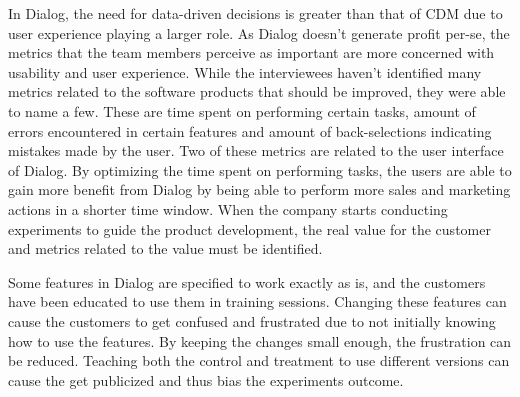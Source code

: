 \documentclass[english]{tktltiki2}
\theoremstyle{definition}
\theoremstyle{remark}
\begin{document}
In Dialog, the need for data-driven decisions is greater than that of CDM due to user experience playing a larger role. As Dialog doesn't generate profit per-se, the metrics that the team members perceive as important are more concerned with usability and user experience. While the interviewees haven't identified many metrics related to the software products that should be improved, they were able to name a few. These are time spent on performing certain tasks, amount of errors encountered in certain features and amount of back-selections indicating mistakes made by the user. Two of these metrics are related to the user interface of Dialog. By optimizing the time spent on performing tasks, the users are able to gain more benefit from Dialog by being able to perform more sales and marketing actions in a shorter time window. When the company starts conducting experiments to guide the product development, the real value for the customer and metrics related to the value must be identified.

Some features in Dialog are specified to work exactly as is, and the customers have been educated to use them in training sessions. Changing these features can cause the customers to get confused and frustrated due to not initially knowing how to use the features. By keeping the changes small enough, the frustration can be reduced. Teaching both the control and treatment to use different versions can cause the get publicized and thus bias the experiments outcome.   






\end{document}
